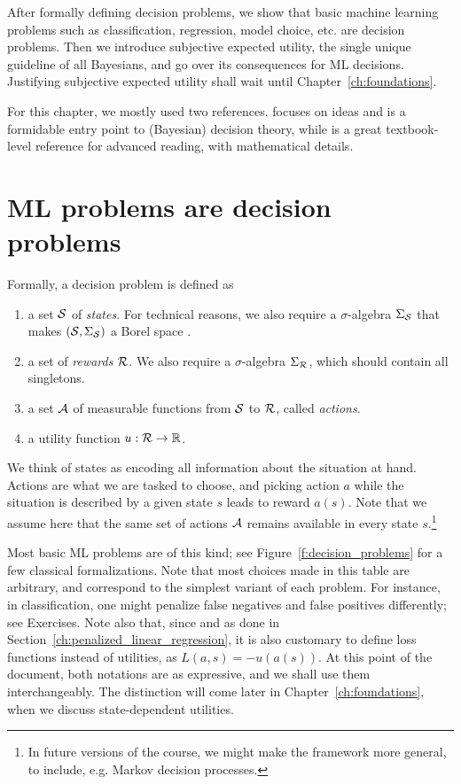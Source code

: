 After formally defining decision problems, we show that basic machine learning problems such as classification, regression, model choice, etc. are decision problems. 
Then we introduce subjective expected utility, the single unique guideline of all Bayesians, and go over its consequences for ML decisions.
Justifying subjective expected utility shall wait until Chapter~\ref{ch:foundations}.

For this chapter, we mostly used two references.
\citep{PaIn09} focuses on ideas and is a formidable entry point to (Bayesian) decision theory, while \citep{Sch12} is a great textbook-level reference for advanced reading, with mathematical details.

\section{ML problems are decision problems}

Formally, a decision problem is defined as 
\begin{enumerate}
    \item a set $\mathcal{S}$ of \emph{states}. For technical reasons, we also require a $\sigma$-algebra $\Sigma_{\mathcal{S}}$ that makes $(\mathcal{S}, \Sigma_{\mathcal{S}})$ a Borel space \citep{Sch12}.
    \item a set of \emph{rewards} $\mathcal{R}$. We also require a $\sigma$-algebra $\Sigma_{\mathcal{R}}$, which should contain all singletons. 
    \item a set $\mathcal{A}$ of measurable functions from $\mathcal{S}$ to $\mathcal{R}$, called \emph{actions}.
    \item a utility function $u:\mathcal{R} \rightarrow \mathbb{R}$.
\end{enumerate}
We think of states as encoding all information about the situation at hand. Actions are what we are tasked to choose, and picking action $a$ while the situation is described by a given state $s$ leads to reward $a(s)$.
Note that we assume here that the same set of actions $\mathcal{A}$ remains available in every state $s$.\footnote{In future versions of the course, we might make the framework more general, to include, e.g. Markov decision processes.} 

Most basic ML problems are of this kind; see Figure~\ref{f:decision_problems} for a few classical formalizations. 
Note that most choices made in this table are arbitrary, and correspond to the simplest variant of each problem. For instance, in classification, one might penalize false negatives and false positives differently; see Exercises.
Note also that, since \cite{Wal50} and as done in Section~\ref{ch:penalized_linear_regression}, it is also customary to define loss functions instead of utilities, as $L(a,s) = -u(a(s))$. 
At this point of the document, both notations are as expressive, and we shall use them interchangeably.
The distinction will come later in Chapter~\ref{ch:foundations}, when we discuss state-dependent utilities.

